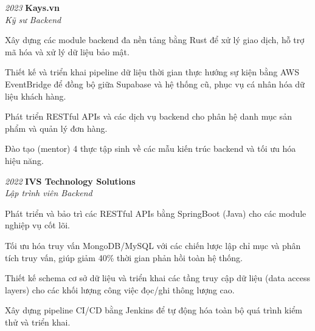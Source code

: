 \begin{twocolentry}{\textit{2023}}
    \textbf{Kays.vn} \\[4pt]
    \textit{Kỹ sư Backend}
\end{twocolentry}
\begin{onecolentry}
    \begin{highlights}
        \item Xây dựng các module backend đa nền tảng bằng Rust để xử lý giao dịch, hỗ trợ mã hóa và xử lý dữ liệu bảo mật.
        \item Thiết kế và triển khai pipeline dữ liệu thời gian thực hướng sự kiện bằng AWS EventBridge để đồng bộ giữa Supabase và hệ thống cũ, phục vụ cá nhân hóa dữ liệu khách hàng.
        \item Phát triển RESTful APIs và các dịch vụ backend cho phân hệ danh mục sản phẩm và quản lý đơn hàng.
        \item Đào tạo (mentor) 4 thực tập sinh về các mẫu kiến trúc backend và tối ưu hóa hiệu năng.
    \end{highlights}
\end{onecolentry}
\vspace{0.2 cm}

\begin{twocolentry}{\textit{2022}}
    \textbf{IVS Technology Solutions} \\[4pt]
    \textit{Lập trình viên Backend}
\end{twocolentry}
\begin{onecolentry}
    \begin{highlights}
        \item Phát triển và bảo trì các RESTful APIs bằng SpringBoot (Java) cho các module nghiệp vụ cốt lõi.
        \item Tối ưu hóa truy vấn MongoDB/MySQL với các chiến lược lập chỉ mục và phân tích truy vấn, giúp giảm 40\% thời gian phản hồi toàn hệ thống.
        \item Thiết kế schema cơ sở dữ liệu và triển khai các tầng truy cập dữ liệu (data access layers) cho các khối lượng công việc đọc/ghi thông lượng cao.
        \item Xây dựng pipeline CI/CD bằng Jenkins để tự động hóa toàn bộ quá trình kiểm thử và triển khai.
    \end{highlights}
\end{onecolentry}


